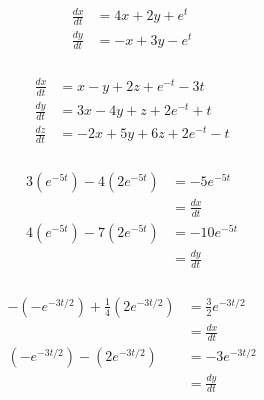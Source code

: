\documentclass{article}
\begin{document}
\setcounter{subsubsection}{6}
\subsubsection{}

\begin{align*}
  \frac{d x}{d t} & = 4 x + 2 y + e^t \\
  \frac{d y}{d t} & = -x + 3 y - e^t
\end{align*}

\setcounter{subsubsection}{8}
\subsubsection{}

\begin{align*}
  \frac{d x}{d t} & = x - y + 2 z + e^{-t} - 3 t      \\
  \frac{d y}{d t} & = 3 x - 4 y + z + 2 e^{-t} + t    \\
  \frac{d z}{d t} & = -2 x + 5 y + 6 z + 2 e^{-t} - t
\end{align*}

\setcounter{subsubsection}{10}
\subsubsection{}

\begin{align*}
  3 (e^{-5 t}) - 4 (2 e^{-5 t}) & = -5 e^{-5 t}     \\
                                & = \frac{d x}{d t} \\
  4 (e^{-5 t}) - 7 (2 e^{-5 t}) & = -10 e^{-5 t}    \\
                                & = \frac{d y}{d t}
\end{align*}

\setcounter{subsubsection}{12}
\subsubsection{}

\begin{align*}
  -(-e^{-3 t / 2}) + \frac{1}{4} (2 e^{-3 t / 2}) & = \frac{3}{2} e^{-3 t / 2} \\
                                                  & = \frac{d x}{d t}          \\
  (-e^{-3 t / 2}) - (2 e^{-3 t / 2})              & = -3 e^{-3 t / 2}          \\
                                                  & = \frac{d y}{d t}
\end{align*}
\end{document}
